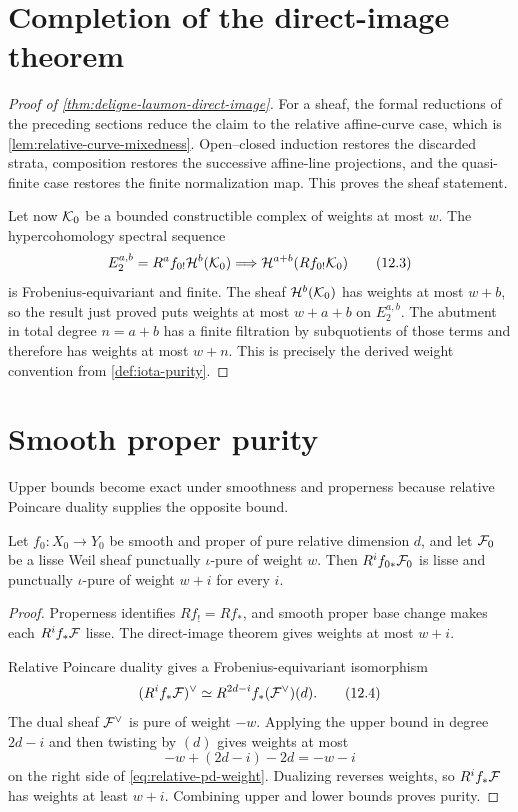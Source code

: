 \section{Completion of the direct-image theorem}

\begin{proof}[Proof of \cref{thm:deligne-laumon-direct-image}]
For a sheaf, the formal reductions of the preceding sections reduce the
claim to the relative affine-curve case, which is
\cref{lem:relative-curve-mixedness}.  Open--closed induction restores the
discarded strata, composition restores the successive affine-line
projections, and the quasi-finite case restores the finite normalization
map.  This proves the sheaf statement.

Let now \(\mathcal K_0\) be a bounded constructible complex of weights at most
\(w\).  The hypercohomology spectral sequence
\[
  E_2^{a,b}
  =
  R^af_{0!}\mathcal H^b(\mathcal K_0)
  \Longrightarrow
  \mathcal H^{a+b}(Rf_{0!}\mathcal K_0)
\tag{12.3}
\label{eq:weight-hypercohomology-ss}
\]
is Frobenius-equivariant and finite.  The sheaf
\(\mathcal H^b(\mathcal K_0)\) has weights at most \(w+b\), so the result just proved
puts weights at most \(w+a+b\) on \(E_2^{a,b}\).  The abutment in total
degree \(n=a+b\) has a finite filtration by subquotients of those terms
and therefore has weights at most \(w+n\).  This is precisely the derived
weight convention from \cref{def:iota-purity}.
\end{proof}

\section{Smooth proper purity}

Upper bounds become exact under smoothness and properness because
relative Poincare duality supplies the opposite bound.

\begin{corollary}
\label{cor:smooth-proper-purity}
Let \(f_0:X_0\to Y_0\) be smooth and proper of pure relative dimension
\(d\), and let \(\mathcal F_0\) be a lisse Weil sheaf punctually
\(\iota\)-pure of weight \(w\).  Then \(R^if_{0*}\mathcal F_0\) is lisse and
punctually \(\iota\)-pure of weight \(w+i\) for every \(i\).
\end{corollary}

\begin{proof}
Properness identifies \(Rf_!=Rf_*\), and smooth proper base change makes
each \(R^if_*\mathcal F\) lisse.  The direct-image theorem gives weights at most
\(w+i\).

Relative Poincare duality gives a Frobenius-equivariant isomorphism
\[
  (R^if_*\mathcal F)^\vee
  \simeq
  R^{2d-i}f_*(\mathcal F^\vee)(d).
\tag{12.4}
\label{eq:relative-pd-weight}
\]
The dual sheaf \(\mathcal F^\vee\) is pure of weight \(-w\).  Applying the upper
bound in degree \(2d-i\) and then twisting by \((d)\) gives weights at
most
\[
  -w+(2d-i)-2d=-w-i
\]
on the right side of \eqref{eq:relative-pd-weight}.  Dualizing reverses
weights, so \(R^if_*\mathcal F\) has weights at least \(w+i\).  Combining upper
and lower bounds proves purity.
\end{proof}


